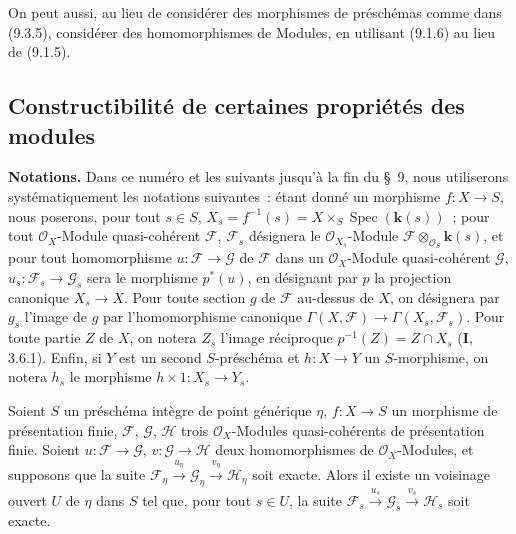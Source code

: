 On peut aussi, au lieu de considérer des morphismes de préschémas comme dans
(9.3.5), considérer des homomorphismes de Modules, en utilisant (9.1.6) au
lieu de (9.1.5).


\subsection{Constructibilité de certaines propriétés des modules}
\label{subsection:IV.9.4-fr}

\begin{env}[9.4.1]
\label{IV.9.4.1-fr}
\textbf{Notations.} Dans ce numéro et les suivants jusqu'à la fin du \S~9,
nous utiliserons systématiquement les notations suivantes~: étant donné un
morphisme $f:X\to S$, nous poserons, pour tout $s\in S$,
$X_s=f^{-1}(s)=X\times_S\operatorname{Spec}(\mathbf{k}(s))$~; pour tout
$\mathcal O_X$-Module quasi-cohérent $\mathcal F$, $\mathcal F_s$ désignera
le $\mathcal O_{X_s}$-Module
$\mathcal F\otimes_{\mathcal O_S}\mathbf{k}(s)$, et pour tout homomorphisme
$u:\mathcal F\to\mathcal G$ de $\mathcal F$ dans un $\mathcal O_X$-Module
quasi-cohérent $\mathcal G$, $u_s:\mathcal F_s\to\mathcal G_s$ sera le
morphisme $p^*(u)$, en désignant par $p$ la projection canonique $X_s\to X$.
Pour toute section $g$ de $\mathcal F$ au-dessus de $X$, on désignera par
$g_s$ l'image de $g$ par l'homomorphisme canonique
$\Gamma(X,\mathcal F)\to\Gamma(X_s,\mathcal F_s)$. Pour toute partie $Z$ de
$X$, on notera $Z_s$ l'image réciproque
$p^{-1}(Z)=Z\cap X_s$ (\textbf{I}, 3.6.1). Enfin, si $Y$ est un second
$S$-préschéma et $h:X\to Y$ un $S$-morphisme, on notera $h_s$ le morphisme
$h\times1:X_s\to Y_s$.
\end{env}

\begin{proposition}[9.4.2]
\label{IV.9.4.2-fr}
Soient $S$ un préschéma intègre de point générique $\eta$, $f:X\to S$ un
morphisme de présentation finie, $\mathcal F$, $\mathcal G$, $\mathcal H$
trois $\mathcal O_X$-Modules quasi-cohérents de présentation finie. Soient
$u:\mathcal F\to\mathcal G$, $v:\mathcal G\to\mathcal H$ deux
homomorphismes de $\mathcal O_X$-Modules, et supposons que la suite
$\mathcal F_\eta\xrightarrow{u_\eta}\mathcal G_\eta
\xrightarrow{v_\eta}\mathcal H_\eta$ soit exacte. Alors il existe un
voisinage ouvert $U$ de $\eta$ dans $S$ tel que, pour tout $s\in U$, la suite
$\mathcal F_s\xrightarrow{u_s}\mathcal G_s
\xrightarrow{v_s}\mathcal H_s$ soit exacte.
\end{proposition}


